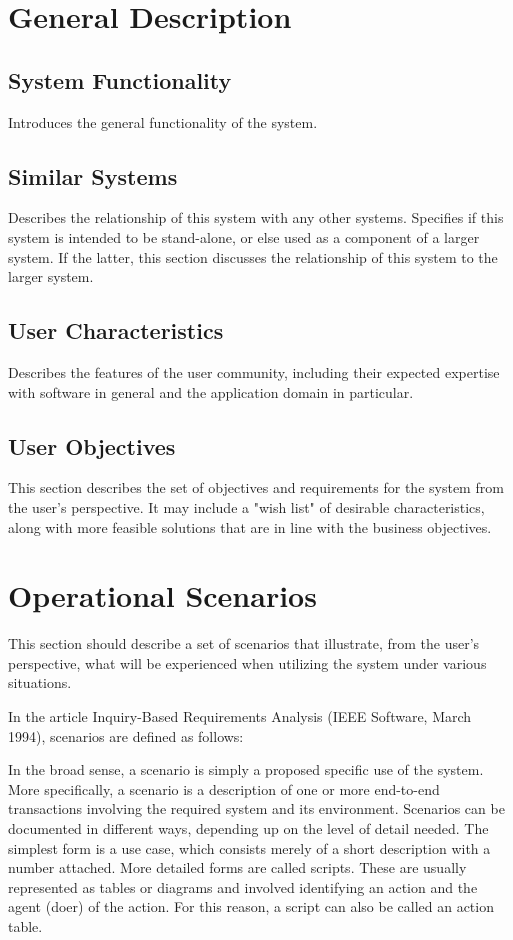 \section{General Description}

\subsection{System Functionality}
Introduces the general functionality of the system.

\subsection{Similar Systems}
Describes the relationship of this system with any other systems. Specifies
if this system is intended to be stand-alone, or else used as a component
of a larger system. If the latter, this section discusses the relationship
of this system to the larger system.

\subsection{User Characteristics}
Describes the features of the user community, including their expected
expertise with software in general and the application domain in
particular.

\subsection{User Objectives}
This section describes the set of objectives and requirements for the
system from the user's perspective. It may include a "wish list" of
desirable characteristics, along with more feasible solutions that are in
line with the business objectives.

\section{Operational Scenarios}

This section should describe a set of scenarios that illustrate, from the
user's perspective, what will be experienced when utilizing the system
under various situations.

In the article Inquiry-Based Requirements Analysis (IEEE Software, March
1994), scenarios are defined as follows:

In the broad sense, a scenario is simply a proposed specific use of the
system. More specifically, a scenario is a description of one or more
end-to-end transactions involving the required system and its environment.
Scenarios can be documented in different ways, depending up on the level of
detail needed. The simplest form is a use case, which consists merely of a
short description with a number attached.  More detailed forms are called
scripts. These are usually represented as tables or diagrams and involved
identifying an action and the agent (doer) of the action. For this reason,
a script can also be called an action table.

